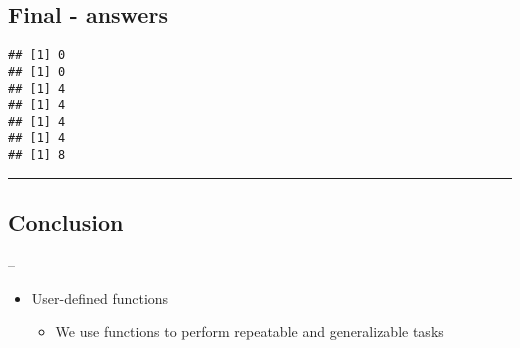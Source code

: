 \documentclass[]{article}
\newenvironment{Shaded}{\begin{snugshade}}{\end{snugshade}}
\newcommand{\ControlFlowTok}[1]{\textcolor[rgb]{0.13,0.29,0.53}{\textbf{#1}}}
\newcommand{\DataTypeTok}[1]{\textcolor[rgb]{0.13,0.29,0.53}{#1}}
\newcommand{\DecValTok}[1]{\textcolor[rgb]{0.00,0.00,0.81}{#1}}
\newcommand{\KeywordTok}[1]{\textcolor[rgb]{0.13,0.29,0.53}{\textbf{#1}}}
\newcommand{\NormalTok}[1]{#1}
\newcommand{\OperatorTok}[1]{\textcolor[rgb]{0.81,0.36,0.00}{\textbf{#1}}}
\newcommand{\StringTok}[1]{\textcolor[rgb]{0.31,0.60,0.02}{#1}}
\providecommand{\tightlist}{%
  \setlength{\itemsep}{0pt}\setlength{\parskip}{0pt}}
\begin{document}
\hypertarget{final---answers-3}{%
\subsection{Final - answers}\label{final---answers-3}}

\begin{Shaded}
\end{Shaded}

\begin{verbatim}
## [1] 0
## [1] 0
## [1] 4
## [1] 4
## [1] 4
## [1] 4
## [1] 8
\end{verbatim}

\begin{center}\rule{0.5\linewidth}{\linethickness}\end{center}

\hypertarget{conclusion}{%
\subsection{Conclusion}\label{conclusion}}

--

\begin{itemize}
\tightlist
\item
  User-defined functions

  \begin{itemize}
  \tightlist
  \item
    We use functions to perform repeatable and generalizable tasks
  \end{itemize}
\end{itemize}
\end{document}

